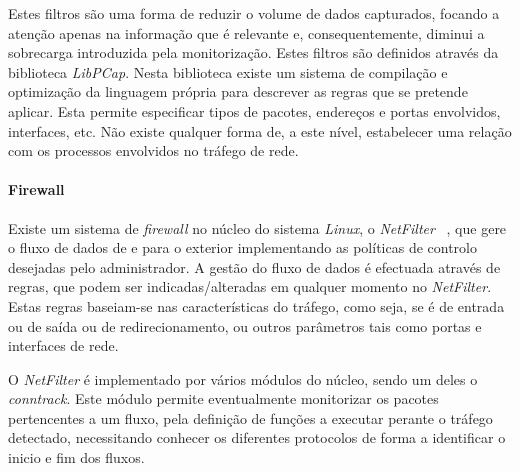 \documentclass[a4paper]{llncs}
\newcommand{\td}[1]{\todo[inline]{#1}}
\begin{document}



Estes filtros são uma forma de reduzir o volume de dados capturados, focando a atenção apenas na informação que é relevante e, consequentemente, diminui a sobrecarga introduzida pela monitorização. Estes filtros são definidos através da biblioteca \textit{LibPCap}. Nesta biblioteca existe um sistema de compilação e optimização da linguagem própria para descrever as regras que se pretende aplicar. Esta permite especificar tipos de pacotes, endereços e portas envolvidos, interfaces, etc. Não existe qualquer forma de, a este nível, estabelecer uma relação com os processos envolvidos no tráfego de rede.




\paragraph{Firewall\\}

Existe um sistema de \textit{firewall} no núcleo do sistema \textit{Linux}, o \textit{NetFilter} ~\cite{netfiltersite}, que gere o fluxo de dados de e para o exterior implementando as políticas de controlo desejadas pelo administrador. A gestão do fluxo de dados é efectuada através de regras, que podem ser indicadas/alteradas em qualquer momento no \textit{NetFilter}. Estas regras baseiam-se nas características do tráfego, como seja, se é de entrada ou de saída ou de redirecionamento, ou outros parâmetros tais como portas e interfaces de rede.

O \textit{NetFilter} é implementado por vários módulos do núcleo, sendo um deles o \textit{conntrack}\cite{CTS}. Este módulo permite eventualmente monitorizar os pacotes pertencentes a um fluxo, pela definição de funções a executar perante o tráfego detectado, necessitando conhecer os diferentes protocolos de forma a identificar o  inicio e fim dos fluxos. 
\end{document}
